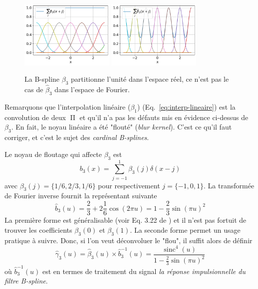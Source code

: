 \documentclass[11pt,twoside]{article}
\DeclareMathOperator{\sinc}{sinc}
\DeclareMathOperator{\boxcar}{{\mbox{$\Pi$}}}
\begin{document}
%
\begin{figure}
\centering
\includegraphics[width=0.4\textwidth]{fig8a.png}
\includegraphics[width=0.4\textwidth]{fig8b.png}
\caption{La B-spline $\beta_3$ partitionne l'unité dans l'espace réel, ce n'est pas le cas de $\hat{\beta}_3$ dans l'espace de Fourier.}
\label{fig-UnityBspline3}
\end{figure}
%

Remarquons que l'interpolation linéaire ($\beta_1$) (Eq.~\ref{eq:interp-lineaire}) est la convolution de deux $\boxcar$ et qu'il n'a pas les défauts mis en évidence ci-dessus de $\beta_3$. En fait, le noyau linéaire a été "flouté" (\textit{blur kernel}). C'est ce qu'il faut corriger, et c'est le sujet des \textit{cardinal B-splines}.

Le noyau de floutage qui affecte $\beta_3$ est 
\begin{equation}
b_3(x) = \sum_{j=-1}^1 \beta_3(j)\delta(x-j)
\end{equation}
avec $\beta_3(j)=\{1/6,2/3,1/6\}$ pour respectivement $j=\{-1,0,1\}$. La transformée de Fourier inverse fournit la représentant suivante 
\begin{equation}
\hat{b}_3(u)= \frac{2}{3} + 2\frac{1}{6}\cos(2\pi u) = 1-\frac{2}{3}\sin(\pi u)^2
\end{equation}
La première forme est généralisable (voir Eq. 3.22 de \cite{Unser1993a}) et il n'est pas fortuit de trouver les coefficients $\beta_3(0)$ et $\beta_3(1)$. La seconde forme permet un usage pratique à suivre. Donc, si l'on veut déconvoluer le "flou", il suffit alors de définir 
\begin{equation}
\hat{\gamma}_3(u) = \hat{\beta}_3(u)\times \hat{b}^{-1}_3(u) = \frac{\sinc^4(u)}{1-\frac{2}{3}\sin(\pi u)^2}
\label{eq:hatgam3}
\end{equation}  
où $\hat{b}^{-1}_3(u)$ est en termes de traitement du signal \textit{la réponse impulsionnelle du filtre B-spline}.
\end{document}
